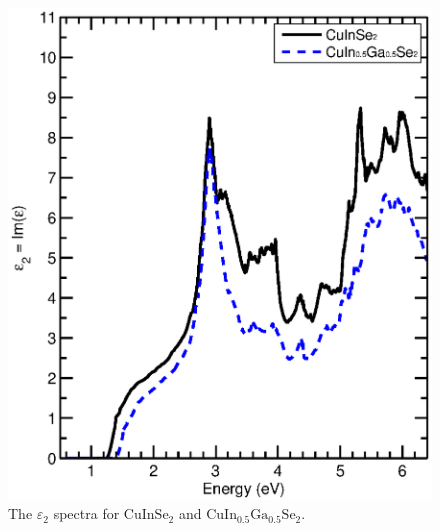 \documentclass[a4paper, 12pt, titlepage,oneside,drop]{kthesis}
\begin{document}
\begin{figure}[H]
\begin{center}
\includegraphics[scale=0.7]{thesis2.eps}
\end{center}
\caption{The $\varepsilon_2$ spectra for ${\mathrm{ CuInSe_2}}$ and $\mathrm {CuIn_{0.5}Ga_{0.5}Se_2}$. }
\label{ccccc}
\end{figure}
\end{document}
